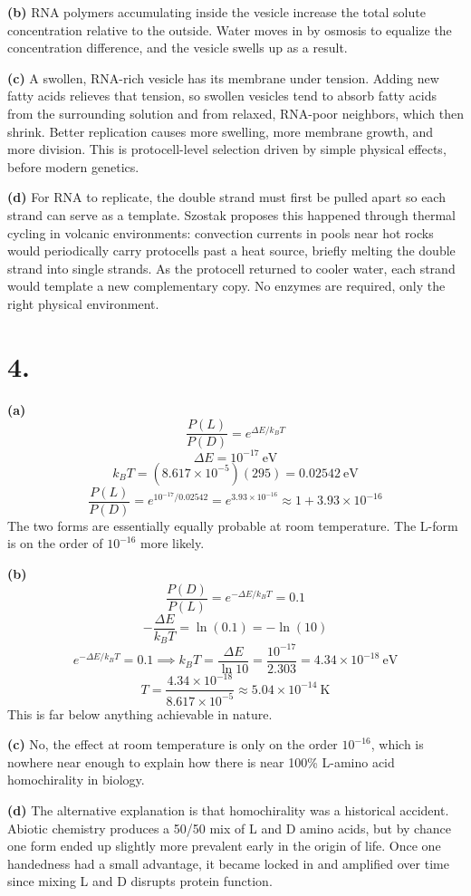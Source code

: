 \documentclass[11pt]{article}
\begin{document}
\textbf{(b)} RNA polymers accumulating inside the vesicle increase the total solute concentration relative to the outside. Water moves in by osmosis to equalize the concentration difference, and the vesicle swells up as a result.

\textbf{(c)} A swollen, RNA-rich vesicle has its membrane under tension. Adding new fatty acids relieves that tension, so swollen vesicles tend to absorb fatty acids from the surrounding solution and from relaxed, RNA-poor neighbors, which then shrink. Better replication causes more swelling, more membrane growth, and more division. This is protocell-level selection driven by simple physical effects, before modern genetics.

\textbf{(d)} For RNA to replicate, the double strand must first be pulled apart so each strand can serve as a template. Szostak proposes this happened through thermal cycling in volcanic environments: convection currents in pools near hot rocks would periodically carry protocells past a heat source, briefly melting the double strand into single strands. As the protocell returned to cooler water, each strand would template a new complementary copy. No enzymes are required, only the right physical environment.

\section*{4.}

\textbf{(a)}
\[
\frac{P(L)}{P(D)} = e^{\Delta E / k_BT}
\]
\[
\Delta E = 10^{-17}\ \text{eV}
\]
\[
k_BT = (8.617\times10^{-5})(295) = 0.02542\ \text{eV}
\]
\[
\frac{P(L)}{P(D)} = e^{10^{-17}/0.02542} = e^{3.93\times10^{-16}} \approx \boxed{1 + 3.93\times10^{-16}}
\]
The two forms are essentially equally probable at room temperature. The L-form is on the order of  $10^{-16}$ more likely.


\textbf{(b)}
\[
\frac{P(D)}{P(L)} = e^{-\Delta E / k_BT} = 0.1
\]
\[
-\frac{\Delta E}{k_BT} = \ln(0.1) = -\ln(10)
\]
\[
e^{-\Delta E / k_BT} = 0.1 \implies k_BT = \frac{\Delta E}{\ln 10} = \frac{10^{-17}}{2.303} = 4.34\times10^{-18}\ \text{eV}
\]
\[
T = \frac{4.34\times10^{-18}}{8.617\times10^{-5}} \approx \boxed{5.04\times10^{-14}\ \text{K}}
\]
This is far below anything achievable in nature.

\textbf{(c)} No, the effect at room temperature is only on the order $ 10^{-16}$, which is nowhere near enough to explain how there is near 100\% L-amino acid homochirality in biology.

\textbf{(d)} The alternative explanation is that homochirality was a historical accident. Abiotic chemistry produces a 50/50 mix of L and D amino acids, but by chance one form ended up slightly more prevalent early in the origin of life. Once one handedness had a small advantage, it became locked in and amplified over time since mixing L and D disrupts protein function.
\end{document}
